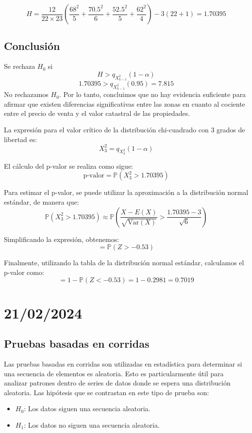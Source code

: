 \documentclass{article}
\begin{document}
\[ H = \frac{12}{22 \times 23} \left(\frac{68^2}{5} + \frac{70.5^2}{6} + \frac{52.5^2}{5} + \frac{62^2}{4}\right) - 3(22 + 1) = 1.70395 \]

\subsection*{Conclusión}

Se rechaza $H_0$ si
\[H > q_{X^{2}_{k-1}}(1 - \alpha)\]
\[1.70395 > q_{X^{2}_{k-1}}(0.95) = 7.815\]
No rechazamos $H_0$. Por lo tanto, concluimos que no hay evidencia suficiente para afirmar que existen diferencias significativas entre las zonas en cuanto al cociente entre el precio de venta y el valor catastral de las propiedades.

La expresión para el valor crítico de la distribución chi-cuadrado con 3 grados de libertad es:
\[X^2_3 = q_{X^2_3}(1-\alpha)\]

El cálculo del p-valor se realiza como sigue:
\[\text{p-valor} = \mathbb{P}(X^2_3 > 1.70395)\]

Para estimar el p-valor, se puede utilizar la aproximación a la distribución normal estándar, de manera que:
\[\mathbb{P}(X^2_3 > 1.70395) \approx \mathbb{P}\left(\frac{X - E(X)}{\sqrt{\text{Var}(X)}} > \frac{1.70395 - 3}{\sqrt{6}}\right)\]

Simplificando la expresión, obtenemos:
\[ = \mathbb{P}(Z > -0.53)\]

Finalmente, utilizando la tabla de la distribución normal estándar, calculamos el p-valor como:
\[= 1 - \mathbb{P}(Z < -0.53) = 1 - 0.2981 = 0.7019\]

\section{21/02/2024}

\subsection{Pruebas basadas en corridas}

Las pruebas basadas en corridas son utilizadas en estadística para determinar si una secuencia de elementos es aleatoria. Esto es particularmente útil para analizar patrones dentro de series de datos donde se espera una distribución aleatoria. Las hipótesis que se contrastan en este tipo de prueba son:

\begin{itemize}
    \item $H_0$: Los datos siguen una secuencia aleatoria.
    \item $H_1$: Los datos no siguen una secuencia aleatoria.
\end{itemize}
\end{document}
